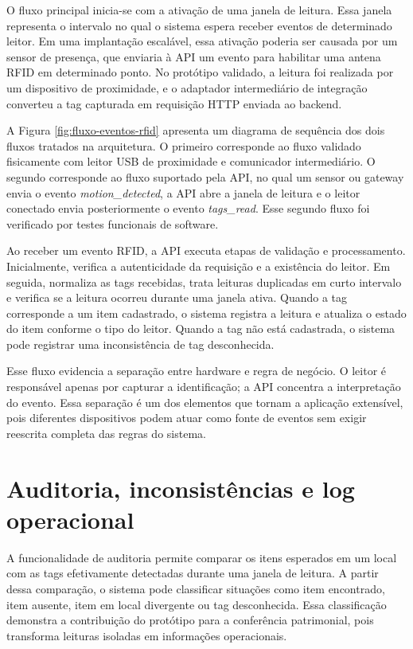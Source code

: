 O fluxo principal inicia-se com a ativação de uma janela de leitura. Essa janela representa o intervalo no qual o sistema espera receber eventos de determinado leitor. Em uma implantação escalável, essa ativação poderia ser causada por um sensor de presença, que enviaria à API um evento para habilitar uma antena RFID em determinado ponto. No protótipo validado, a leitura foi realizada por um dispositivo de proximidade, e o adaptador intermediário de integração converteu a tag capturada em requisição HTTP enviada ao backend.

A Figura \ref{fig:fluxo-eventos-rfid} apresenta um diagrama de sequência dos dois fluxos tratados na arquitetura. O primeiro corresponde ao fluxo validado fisicamente com leitor USB de proximidade e comunicador intermediário. O segundo corresponde ao fluxo suportado pela API, no qual um sensor ou gateway envia o evento \textit{motion\_detected}, a API abre a janela de leitura e o leitor conectado envia posteriormente o evento \textit{tags\_read}. Esse segundo fluxo foi verificado por testes funcionais de software.



Ao receber um evento RFID, a API executa etapas de validação e processamento. Inicialmente, verifica a autenticidade da requisição e a existência do leitor. Em seguida, normaliza as tags recebidas, trata leituras duplicadas em curto intervalo e verifica se a leitura ocorreu durante uma janela ativa. Quando a tag corresponde a um item cadastrado, o sistema registra a leitura e atualiza o estado do item conforme o tipo do leitor. Quando a tag não está cadastrada, o sistema pode registrar uma inconsistência de tag desconhecida.

Esse fluxo evidencia a separação entre hardware e regra de negócio. O leitor é responsável apenas por capturar a identificação; a API concentra a interpretação do evento. Essa separação é um dos elementos que tornam a aplicação extensível, pois diferentes dispositivos podem atuar como fonte de eventos sem exigir reescrita completa das regras do sistema.

\section{Auditoria, inconsistências e log operacional}
\label{sec:auditoria-inconsistencias-log}

A funcionalidade de auditoria permite comparar os itens esperados em um local com as tags efetivamente detectadas durante uma janela de leitura. A partir dessa comparação, o sistema pode classificar situações como item encontrado, item ausente, item em local divergente ou tag desconhecida. Essa classificação demonstra a contribuição do protótipo para a conferência patrimonial, pois transforma leituras isoladas em informações operacionais.

